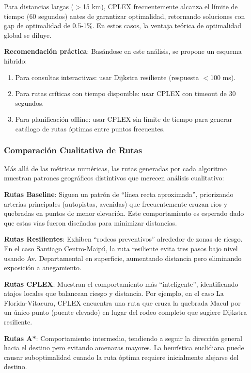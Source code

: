 \documentclass[conference]{IEEEtran}
\begin{document}
Para distancias largas ($>$15 km), CPLEX frecuentemente alcanza el límite de tiempo (60 segundos) antes de garantizar optimalidad, retornando soluciones con gap de optimalidad de 0.5-1\%. En estos casos, la ventaja teórica de optimalidad global se diluye.

\textbf{Recomendación práctica}: Basándose en este análisis, se propone un esquema híbrido:
\begin{enumerate}
    \item Para consultas interactivas: usar Dijkstra resiliente (respuesta $<$100 ms).
    \item Para rutas críticas con tiempo disponible: usar CPLEX con timeout de 30 segundos.
    \item Para planificación offline: usar CPLEX sin límite de tiempo para generar catálogo de rutas óptimas entre puntos frecuentes.
\end{enumerate}

\subsubsection{Comparación Cualitativa de Rutas}

Más allá de las métricas numéricas, las rutas generadas por cada algoritmo muestran patrones geográficos distintivos que merecen análisis cualitativo:

\textbf{Rutas Baseline}: Siguen un patrón de ``línea recta aproximada'', priorizando arterias principales (autopistas, avenidas) que frecuentemente cruzan ríos y quebradas en puntos de menor elevación. Este comportamiento es esperado dado que estas vías fueron diseñadas para minimizar distancias.

\textbf{Rutas Resilientes}: Exhiben ``rodeos preventivos'' alrededor de zonas de riesgo. En el caso Santiago Centro-Maipú, la ruta resiliente evita tres pasos bajo nivel usando Av. Departamental en superficie, aumentando distancia pero eliminando exposición a anegamiento.

\textbf{Rutas CPLEX}: Muestran el comportamiento más ``inteligente'', identificando atajos locales que balancean riesgo y distancia. Por ejemplo, en el caso La Florida-Vitacura, CPLEX encuentra una ruta que cruza la quebrada Macul por un único punto (puente elevado) en lugar del rodeo completo que sugiere Dijkstra resiliente.

\textbf{Rutas A*}: Comportamiento intermedio, tendiendo a seguir la dirección general hacia el destino pero evitando amenazas mayores. La heurística euclidiana puede causar suboptimalidad cuando la ruta óptima requiere inicialmente alejarse del destino.
\end{document}
